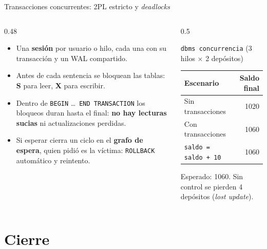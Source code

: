 \documentclass[aspectratio=169,10pt]{beamer}
\begin{document}
\begin{frame}{Transacciones concurrentes: 2PL estricto y \emph{deadlocks}}
  \begin{columns}[T]
    \begin{column}{0.48\textwidth}
      \small
      \begin{itemize}
        \item Una \textbf{sesión} por usuario o hilo, cada una con su transacción y un WAL compartido.
        \item Antes de cada sentencia se bloquean las tablas: \textbf{S} para leer, \textbf{X} para escribir.
        \item Dentro de \texttt{BEGIN} \dots\ \texttt{END TRANSACTION} los bloqueos duran hasta el final: \textbf{no hay lecturas sucias} ni actualizaciones perdidas.
        \item Si esperar cierra un ciclo en el \textbf{grafo de espera}, quien pidió es la víctima: \texttt{ROLLBACK} automático y reintento.
      \end{itemize}
    \end{column}
    \begin{column}{0.5\textwidth}
      \begin{block}{\texttt{dbms concurrencia} (3 hilos $\times$ 2 depósitos)}
        \small
        \begin{tabular}{@{}lr@{}}
          \toprule
          \textbf{Escenario} & \textbf{Saldo final} \\
          \midrule
          Sin transacciones & {\color{rojo}1020} \\
          Con transacciones & {\color{verde}1060} \\
          \texttt{saldo = saldo + 10} & {\color{verde}1060} \\
          \bottomrule
        \end{tabular}
        \vspace{0.3em}

        Esperado: 1060. Sin control se pierden 4 depósitos (\emph{lost update}).
      \end{block}
    \end{column}
  \end{columns}
\end{frame}

\section{Cierre}
\end{document}
